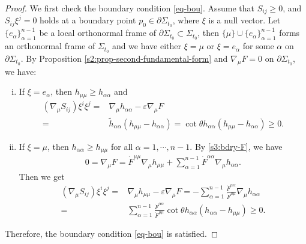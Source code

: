 \documentclass[11pt,reqno]{amsart}
\theoremstyle{definition}
\theoremstyle{remark}
\numberwithin{equation}{section}
\renewcommand{\(}{\left(}
\renewcommand{\)}{\right)}
\renewcommand{\-}{\overline}
\renewcommand{\a}{\alpha}
\renewcommand{\t}{\theta}
\begin{document}
\begin{proof}
We first check the boundary condition \eqref{eq-bou}. Assume that $S_{ij}\geq 0$, and $S_{ij}\xi^j=0$ holds at a boundary point $p_0\in \partial\Sigma_{t_0}$, where $\xi$ is a null vector.    Let $\{e_\a\}_{\a=1}^{n-1}$ be a local orthonormal frame of $\partial \Sigma_{t_0}\subset \Sigma_{t_0}$, then $\{\mu\}\cup\{e_\a\}_{\a=1}^{n-1}$ forms an orthonormal frame of $\Sigma_{t_0}$ and we have either $\xi=\mu$ or $\xi=e_\a$ for some $\a$ on $\partial \Sigma_{t_0}$. By Proposition \ref{s2:prop-second-fundamental-form} and $\nabla_\mu F=0$ on $\partial\Sigma_{t_0}$, we have:
	\begin{enumerate}[(i)]
		\item If $\xi=e_\a$, then $h_{\mu\mu}\geq h_{\a\a}$ and
		\begin{align*}
		(\nabla_\mu S_{ij})\xi^i\xi^j=&\nabla_\mu h_{\a\a}-\varepsilon\nabla_\mu F\\
=&\tilde{h}_{\a\a}(h_{\mu\mu}-h_{\a\a})=\cot\t h_{\a\a}(h_{\mu\mu}-h_{\a\a})\geq 0.
		\end{align*}
		\item If $\xi=\mu$, then $h_{\a\a}\geq h_{\mu\mu}$ for all $\a=1,\cdots,n-1$. By \eqref{s3:bdry-F}, we have
		\begin{align*}
		0=\nabla_\mu F=\dot{F}^{\mu\mu}\nabla_{\mu} h_{\mu\mu}+\sum_{\a=1}^{n-1}\dot{F}^{\a\a}\nabla_{\mu} h_{\a\a}.
		\end{align*}
		Then we get
		\begin{align*}
		(\nabla_\mu S_{ij})\xi^i\xi^j=&\nabla_\mu h_{\mu\mu}-\varepsilon\nabla_\mu F=-\sum_{\a=1}^{n-1}\frac{\dot{F}^{\a\a}}{\dot{F}^{\mu\mu}}\nabla_{\mu} h_{\a\a}\\
		=&\sum_{\a=1}^{n-1}\frac{\dot{F}^{\a\a}}{\dot{F}^{\mu\mu}}\cot\t h_{\a\a}\(h_{\a\a}-h_{\mu\mu}\)\geq 0.
		\end{align*}
	\end{enumerate}
Therefore, the boundary condition \eqref{eq-bou} is satisfied.


\end{proof}
\end{document}
